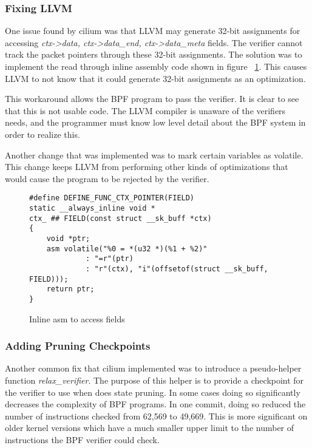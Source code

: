\subsubsection{Fixing LLVM}
One issue found by cilium was that LLVM may generate 32-bit assignments for accessing \emph{ctx->data, ctx->data\_end, ctx->data\_meta} fields.
The verifier cannot track the packet pointers through these 32-bit assignments.
The solution was to implement the read through inline assembly code shown in figure ~\ref{fig:inline-asm}.
This causes LLVM to not know that it could generate 32-bit assignments as an optimization.



This workaround allows the BPF program to pass the verifier.
It is clear to see that this is not usable code.
The LLVM compiler is unaware of the verifiers needs, and the programmer must know low level detail about the BPF system in order to realize this.

Another change that was implemented was to mark certain variables as volatile.
This change keeps LLVM from performing other kinds of optimizations that would cause the program to be rejected by the verifier.

\begin{figure}
    \begin{lstlisting}[language=myC]
#define DEFINE_FUNC_CTX_POINTER(FIELD)
static __always_inline void *
ctx_ ## FIELD(const struct __sk_buff *ctx)
{
	void *ptr;
	asm volatile("%0 = *(u32 *)(%1 + %2)"
		     : "=r"(ptr)
		     : "r"(ctx), "i"(offsetof(struct __sk_buff, FIELD)));
	return ptr;	
}
    \end{lstlisting}
    \caption{Inline asm to access fields}
    \label{fig:inline-asm}
\end{figure}

\subsubsection{Adding Pruning Checkpoints}
Another common fix that cilium implemented was to introduce a pseudo-helper function \emph{relax\_verifier}.
The purpose of this helper is to provide a checkpoint for the verifier to use when does state pruning.
In some cases doing so significantly decreases the complexity of BPF programs.
In one commit, doing so reduced the number of instructions checked from 62,569 to 49,669.
This is more significant on older kernel versions which have a much smaller upper limit to the number of instructions the BPF verifier could check.

